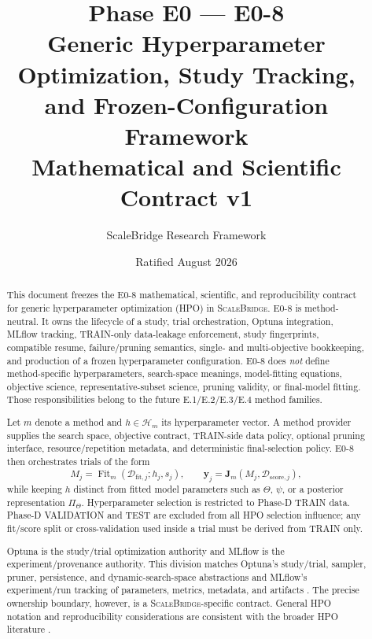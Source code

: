 \documentclass[11pt]{article}
\title{\SB{} Phase E0 --- E0-8\\
Generic Hyperparameter Optimization, Study Tracking,\\
and Frozen-Configuration Framework\\
Mathematical and Scientific Contract v1}
\author{ScaleBridge Research Framework}
\date{Ratified August 2026}
\newcommand{\SB}{\textsc{ScaleBridge}}
\newcommand{\Hspace}{\mathcal{H}}
\newcommand{\Data}{\mathcal{D}}
\begin{document}
\setlength{\emergencystretch}{3em}
\maketitle

\begin{abstract}
This document freezes the E0-8 mathematical, scientific, and reproducibility
contract for generic hyperparameter optimization (HPO) in \SB{}. E0-8 is
method-neutral. It owns the lifecycle of a study, trial orchestration, Optuna
integration, MLflow tracking, TRAIN-only data-leakage enforcement, study
fingerprints, compatible resume, failure/pruning semantics, single- and
multi-objective bookkeeping, and production of a frozen hyperparameter
configuration. E0-8 does \emph{not} define method-specific hyperparameters,
search-space meanings, model-fitting equations, objective science,
representative-subset science, pruning validity, or final-model fitting. Those
responsibilities belong to the future E.1/E.2/E.3/E.4 method families.

Let $m$ denote a method and $h\in\Hspace_m$ its hyperparameter vector. A method
provider supplies the search space, objective contract, TRAIN-side data policy,
optional pruning interface, resource/repetition metadata, and deterministic
final-selection policy. E0-8 then orchestrates trials of the form
\[
M_j=\operatorname{Fit}_m(\Data_{\mathrm{fit},j};h_j,s_j),
\qquad
\mathbf y_j=\mathbf J_m(M_j,\Data_{\mathrm{score},j}),
\]
while keeping $h$ distinct from fitted model parameters such as $\Theta$,
$\psi$, or a posterior representation $\Pi_\Theta$. Hyperparameter selection
is restricted to Phase-D TRAIN data. Phase-D VALIDATION and TEST are excluded
from all HPO selection influence; any fit/score split or cross-validation used
inside a trial must be derived from TRAIN only.

Optuna is the study/trial optimization authority and MLflow is the
experiment/provenance authority. This division matches Optuna's study/trial,
sampler, pruner, persistence, and dynamic-search-space abstractions
\cite{AkibaEtAl2019Optuna,OptunaDocs2026} and MLflow's experiment/run tracking
of parameters, metrics, metadata, and artifacts \cite{MLflowDocs2026}. The
precise ownership boundary, however, is a \SB{}-specific contract. General HPO
notation and reproducibility considerations are consistent with the broader HPO
literature \cite{BischlEtAl2023HPO}.
\end{abstract}

\end{document}
